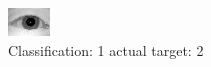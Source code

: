 \begin{figure}[h!]
\begin{center}
\includegraphics[width=0.60\columnwidth]{figures/ID1015_class_1_target_2.png}
\end{center}
\caption{ Classification: 1 actual target: 2}
\label{fig:ID1015_class_1_target_2}
\end{figure}

